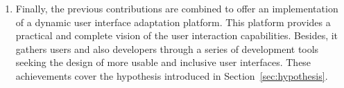 \begin{enumerate}[label=\alph*)]

  \item Finally, the previous contributions are combined to offer an 
  implementation of a dynamic user interface adaptation platform. This platform
  provides a practical and complete vision of the user interaction capabilities.
  Besides, it gathers users and also developers through a series of development
  tools seeking the design of more usable and inclusive user interfaces. These
  achievements cover the hypothesis introduced in Section~\ref{sec:hypothesis}.
  
\end{enumerate}